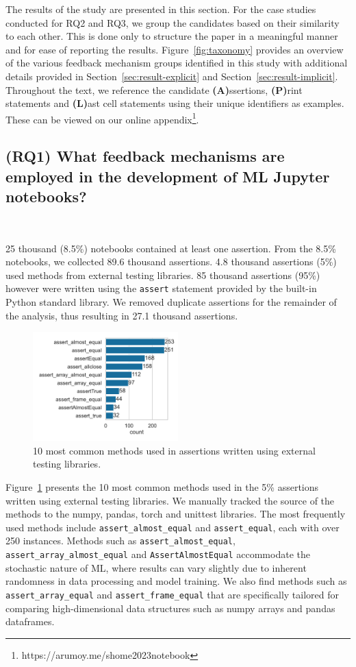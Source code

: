 \documentclass[smallextended]{svjour3}       %
\begin{document}
The results of the study are presented in this section. For the case studies conducted for RQ2 and RQ3, we group the candidates based on their similarity to each other. This is done only to structure the paper in a meaningful manner and for ease of reporting the results. Figure~\ref{fig:taxonomy} provides an overview of the various feedback mechanism groups identified in this study with additional details provided in Section~\ref{sec:result-explicit} and Section~\ref{sec:result-implicit}. Throughout the text, we reference the candidate \textbf{(A)}ssertions, \textbf{(P)}rint statements and \textbf{(L)}ast cell statements using their unique identifiers as examples. These can be viewed on our online appendix\footnote{https://arumoy.me/shome2023notebook}.

\subsection{(RQ1) What feedback mechanisms are employed in the development of ML Jupyter notebooks?}~\label{sec:result-analysis}

25 thousand (8.5\%) notebooks contained at least one assertion. From the 8.5\% notebooks, we collected 89.6 thousand assertions. 4.8 thousand assertions (5\%) used methods from external testing libraries. 85 thousand assertions (95\%) however were written using the \lstinline{assert} statement provided by the built-in Python standard library. We removed duplicate assertions for the remainder of the analysis, thus resulting in 27.1 thousand assertions.

\begin{figure}
  \centering
  \includegraphics[width=0.5\textwidth]{other-test-methods.pdf}
  \caption{10 most common methods used in assertions written using external testing libraries.}
  \label{fig:other-test-methods}
\end{figure}

Figure~\ref{fig:other-test-methods} presents the 10 most common methods used in the 5\% assertions written using external testing libraries. We manually tracked the source of the methods to the numpy, pandas, torch and unittest libraries. The most frequently used methods include \lstinline{assert_almost_equal} and \lstinline{assert_equal}, each with over 250 instances. Methods such as \lstinline{assert_almost_equal}, \lstinline{assert_array_almost_equal} and \lstinline{AssertAlmostEqual} accommodate the stochastic nature of ML, where results can vary slightly due to inherent randomness in data processing and model training. We also find methods such as \lstinline{assert_array_equal} and \lstinline{assert_frame_equal} that are specifically tailored for comparing high-dimensional data structures such as numpy arrays and pandas dataframes.
\end{document}
